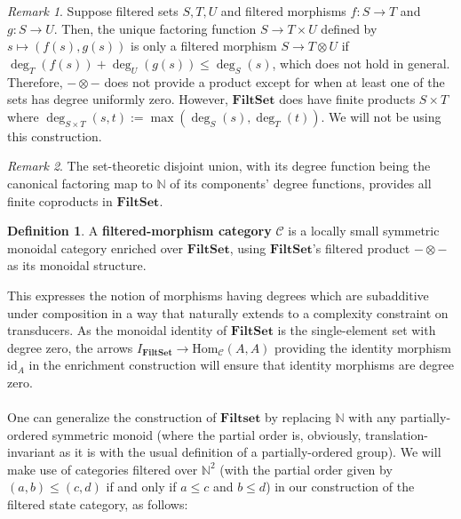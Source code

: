 \documentclass{article}
\theoremstyle{definition}
\newtheorem{definition}{Definition}[section]
\theoremstyle{remark}
\newtheorem*{remark}{Remark}
\begin{document}
\begin{remark}
Suppose filtered sets $S,T,U$ and filtered morphisms $f:S \to T$
and $g:S\to U$. Then, the unique factoring function $S\to T\times U$
defined by $s \mapsto (f(s),g(s))$ is only a filtered morphism 
$S \to T\otimes U$ if
$\deg_T(f(s))+\deg_U(g(s)) \leq \deg_S(s)$, which does not hold in
general. Therefore, $-\otimes -$ does not provide a product except for
when at least one of the sets has degree uniformly zero. However,
$\mathbf{FiltSet}$ does have finite products $S\times T$ where
$\deg_{S\times T}(s,t) := \max(\deg_S(s),\deg_T(t))$. We will not be using
this construction.
\end{remark}

\begin{remark}
The set-theoretic disjoint union,
with its degree function
being the canonical factoring map to $\mathbb{N}$ of its components'
degree functions, provides all finite coproducts in
$\mathbf{FiltSet}$.
\end{remark}

\begin{definition}
    \label{def:filteredmorphism} A \textbf{filtered-morphism
    category}
    $\mathcal{C}$ is a locally small symmetric
    monoidal category enriched over
    $\mathbf{FiltSet}$, using $\mathbf{FiltSet}$'s filtered product
    $-\otimes -$ as its monoidal structure.
\end{definition}
This expresses the notion of morphisms having degrees which
are subadditive under composition in a way that naturally extends to a
complexity constraint on transducers. As the monoidal identity of
$\mathbf{FiltSet}$ is the single-element set with degree zero, the
arrows $I_{\mathbf{FiltSet}} \to \mathrm{Hom}_{\mathcal{C}}(A,A)$ providing
the identity 
morphism $\mathrm{id}_A$
in the enrichment construction will ensure that identity morphisms are
degree zero.
\\ \\
One can generalize the construction of $\mathbf{Filtset}$ by replacing
$\mathbb{N}$ with any partially-ordered symmetric monoid
(where the partial order is, obviously, translation-invariant
as it is with the usual definition of a partially-ordered
group). We will make use of
categories filtered over $\mathbb{N}^2$ (with the partial order
given by $(a,b) \leq (c,d)$ if and
only if $a\leq c$ and $b\leq d$) in our
construction of the filtered state category, as follows:
\end{document}
